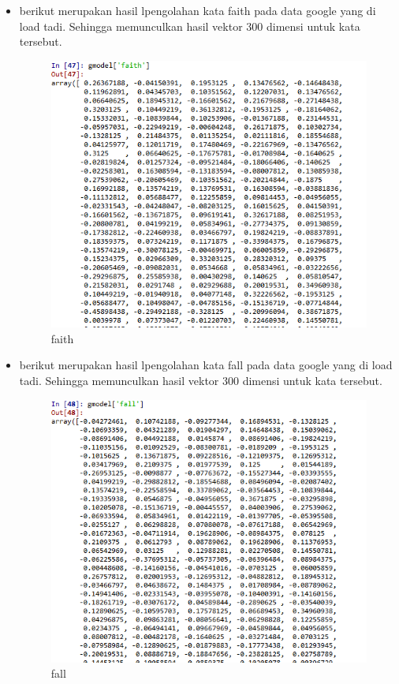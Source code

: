 \begin{enumerate}
\begin{itemize}
				\item berikut merupakan hasil lpengolahan kata faith pada data google yang di load tadi. Sehingga memunculkan hasil vektor 300 dimensi untuk kata tersebut.
	  			\begin{figure}[H]
					\centering
					\includegraphics[scale=0.4]{figures/1174057/chapter5/faith.PNG}
					\caption{faith}
					\label{faith}
				\end{figure}

				\item berikut merupakan hasil lpengolahan kata fall pada data google yang di load tadi. Sehingga memunculkan hasil vektor 300 dimensi untuk kata tersebut.
	  			\begin{figure}[H]
					\centering
					\includegraphics[scale=0.4]{figures/1174057/chapter5/fall.PNG}
					\caption{fall}
					\label{fall}
				\end{figure}


\end{itemize}
\end{enumerate}
